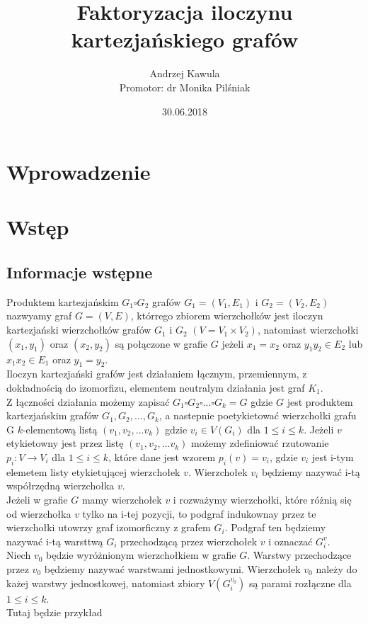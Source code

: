\documentclass[12pt,a4paper,titlepage]{article}
\title{Faktoryzacja iloczynu kartezjańskiego grafów }
\date{30.06.2018}
\author{Andrzej Kawula \\ Promotor: dr Monika Pilśniak}
\begin{document}
\maketitle
\tableofcontents
\newpage
\section{Wprowadzenie}
\section{Wstęp}
\subsection{Informacje wstępne}
Produktem kartezjańskim $G_1 \square G_2 $ grafów $G_1 = (V_1 , E_1 ) $ i $ G_2 =(V_2 , E_2 ) $ nazwyamy graf $G = (V, E)$, którrego zbiorem wierzchołków jest iloczyn kartezjański wierzchołków grafów $G_1$ i $G_2$ $(V=V_1 \times V_2 )$, natomiast wierzchołki $(x_1, y_1)$ oraz $(x_2, y_2)$ są połączone w grafie $G$ jeżeli $x_1 = x_2$ oraz $y_1 y_2 \in E_2 $ lub $x_1 x_2 \in E_1 $ oraz $y_1 = y_2 $.\\
Iloczyn kartezjański grafów jest działaniem łącznym, przemiennym, z dokładnością do izomorfizu, elementem neutralym działania jest graf $K_1$.\\
Z łączności działania możemy zapisać $G_1 \square G_2 \square ... \square G_k = G$ gdzie $G$ jest produktem kartezjańskim grafów $G_1, G_2, ... , G_k$, a nastepnie poetykietować wierzchołki grafu G $k$-elementową listą $(v_1, v_2 , ... v_k )$ gdzie $v_i \in V(G_i)$ dla $1 \leqslant i \leqslant k $. Jeżeli $v$ etykietowny jest przez listę $(v_1, v_2 , ... v_k )$ możemy zdefiniować rzutowanie $p_i : V \rightarrow V_i $ dla $1 \leqslant i \leqslant k $, które dane jest wzorem $p_i (v) = v_i $, gdzie $v_i$ jest i-tym elemetem listy etykietującej wierzchołek $v$. Wierzchołek $v_i $ będziemy nazywać i-tą współrzędną wierzchołka $v$.  \\
Jeżeli w grafie $G$ mamy wierzchołek $v$ i rozważymy wierzchołki, które różnią się od wierzchołka $v$ tylko na i-tej pozycji, to podgraf indukownay przez te wierzchołki utowrzy graf izomorficzny  z grafem $G_i$. Podgraf ten będziemy nazywać i-tą warsttwą $G_i$ przechodzącą przez wierzchołek $v$ i oznaczać $G_i ^v$.\\
Niech $v_0$ będzie wyróżnionym wierzchołkiem w grafie $G$. Warstwy przechodzące przez $v_0$ będziemy nazywać warstwami jednostkowymi. Wierzchołek $v_0$ należy do każej warstwy jednostkowej, natomiast zbiory $V(G_i ^{v_0})$ są parami rozłączne dla $1 \leqslant i \leqslant k $.
\\
Tutaj będzie przykład \\
\\
\end{document}
